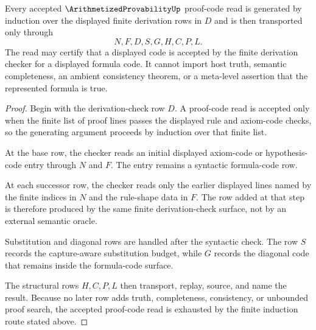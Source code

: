\begin{theorem}
\label{thm:arithmetized-provability-finite-proof-code-induction}
Every accepted $\ArithmetizedProvabilityUp$ proof-code read is generated by induction over the displayed finite derivation rows in $D$ and is then transported only through
$$
N,F,D,S,G,H,C,P,L .
$$
The read may certify that a displayed code is accepted by the finite derivation checker for a displayed formula code. It cannot import host truth, semantic completeness, an ambient consistency theorem, or a meta-level assertion that the represented formula is true.
\end{theorem}
\begin{proof}
Begin with the derivation-check row $D$. A proof-code read is accepted only when the finite list of proof lines passes the displayed rule and axiom-code checks, so the generating argument proceeds by induction over that finite list.

At the base row, the checker reads an initial displayed axiom-code or hypothesis-code entry through $N$ and $F$. The entry remains a syntactic formula-code row.

At each successor row, the checker reads only the earlier displayed lines named by the finite indices in $N$ and the rule-shape data in $F$. The row added at that step is therefore produced by the same finite derivation-check surface, not by an external semantic oracle.

Substitution and diagonal rows are handled after the syntactic check. The row $S$ records the capture-aware substitution budget, while $G$ records the diagonal code that remains inside the formula-code surface.

The structural rows $H,C,P,L$ then transport, replay, source, and name the result. Because no later row adds truth, completeness, consistency, or unbounded proof search, the accepted proof-code read is exhausted by the finite induction route stated above.
\end{proof}



